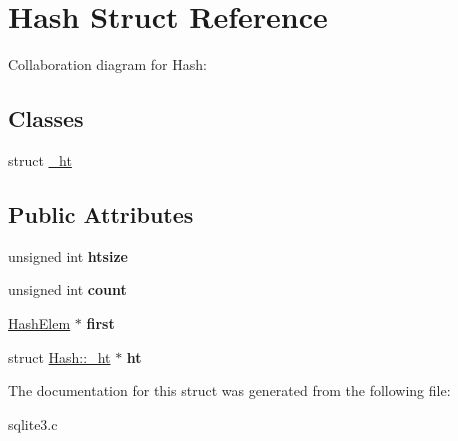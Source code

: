 \hypertarget{structHash}{}\section{Hash Struct Reference}
\label{structHash}


Collaboration diagram for Hash\+:
\subsection*{Classes}
\begin{DoxyCompactItemize}
\item 
struct \hyperlink{structHash_1_1__ht}{\+\_\+ht}
\end{DoxyCompactItemize}
\subsection*{Public Attributes}
\begin{DoxyCompactItemize}
\item 
unsigned int {\bfseries htsize}\hypertarget{structHash_a072258e24a38e09175f1308deb013bc8}{}\label{structHash_a072258e24a38e09175f1308deb013bc8}

\item 
unsigned int {\bfseries count}\hypertarget{structHash_a7ab16f173cdc347ffbe39eaa85ee6fda}{}\label{structHash_a7ab16f173cdc347ffbe39eaa85ee6fda}

\item 
\hyperlink{structHashElem}{Hash\+Elem} $\ast$ {\bfseries first}\hypertarget{structHash_a2cfc9936ca2a624c6492ab6557f4705b}{}\label{structHash_a2cfc9936ca2a624c6492ab6557f4705b}

\item 
struct \hyperlink{structHash_1_1__ht}{Hash\+::\+\_\+ht} $\ast$ {\bfseries ht}\hypertarget{structHash_ac0f36e03746a3fe69643db08d93bc0c4}{}\label{structHash_ac0f36e03746a3fe69643db08d93bc0c4}

\end{DoxyCompactItemize}


The documentation for this struct was generated from the following file\+:\begin{DoxyCompactItemize}
\item 
sqlite3.\+c\end{DoxyCompactItemize}
